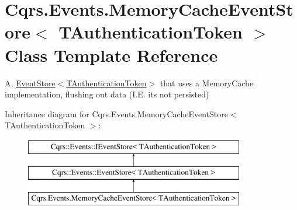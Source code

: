 \hypertarget{classCqrs_1_1Events_1_1MemoryCacheEventStore}{}\section{Cqrs.\+Events.\+Memory\+Cache\+Event\+Store$<$ T\+Authentication\+Token $>$ Class Template Reference}
\label{classCqrs_1_1Events_1_1MemoryCacheEventStore}


A, \hyperlink{classCqrs_1_1Events_1_1EventStore_a6346cb2aea4c5b4e740dc6cfb15abab8_a6346cb2aea4c5b4e740dc6cfb15abab8}{Event\+Store$<$\+T\+Authentication\+Token$>$} that uses a Memory\+Cache implementation, flushing out data (I.\+E. it\textquotesingle{}s not persisted)  


Inheritance diagram for Cqrs.\+Events.\+Memory\+Cache\+Event\+Store$<$ T\+Authentication\+Token $>$\+:\begin{figure}[H]
\begin{center}
\leavevmode
\includegraphics[height=3.000000cm]{classCqrs_1_1Events_1_1MemoryCacheEventStore}
\end{center}
\end{figure}
